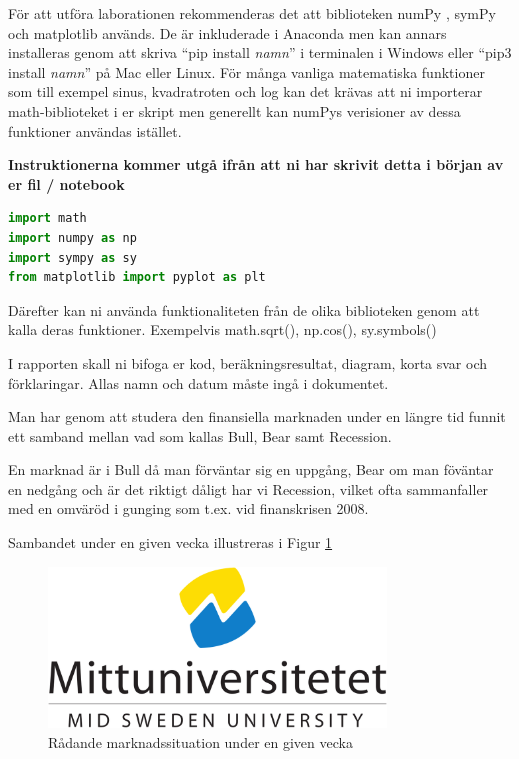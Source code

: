 \documentclass[a4paper]{article}
\begin{document}
För att utföra laborationen rekommenderas det att biblioteken numPy \cite{numpy-main},
symPy \cite{sympy-main} och matplotlib \cite{matplotlib-main} används. De är inkluderade i Anaconda men kan annars installeras genom att
skriva ``pip install \textit{namn}'' i terminalen i Windows eller ``pip3 install \textit{namn}'' på Mac eller Linux.
För många vanliga matematiska funktioner som till
exempel sinus, kvadratroten och log kan det krävas att ni importerar math-biblioteket i er skript men generellt kan numPys
verisioner av dessa funktioner användas istället.

\textbf{Instruktionerna kommer utgå ifrån att ni har skrivit detta i början av er fil / notebook}
\begin{lstlisting}[language=Python]
import math 
import numpy as np
import sympy as sy
from matplotlib import pyplot as plt
\end{lstlisting}

Därefter kan ni använda funktionaliteten från de olika biblioteken genom att
kalla deras funktioner. Exempelvis math.sqrt(), np.cos(), sy.symbols()

I rapporten skall ni bifoga er kod, beräkningsresultat, diagram, korta svar och förklaringar.
Allas namn och datum måste ingå i dokumentet.

\newpage
Man har genom att studera den finansiella marknaden under en längre tid funnit ett samband mellan vad som kallas Bull, Bear samt Recession.

En marknad är i Bull då man förväntar sig en uppgång, Bear om man föväntar en nedgång och är det riktigt dåligt har vi Recession, vilket ofta sammanfaller
med en omväröd i gunging som t.ex. vid finanskrisen 2008.

Sambandet under en given vecka illustreras i Figur \ref{fig:bbr}

\begin{figure}[H]
  \centering
  \includegraphics[width=0.8\textwidth]{msu.png}
  \caption{Rådande marknadssituation under en given vecka}
  \label{fig:bbr}
\end{figure}
\end{document}
